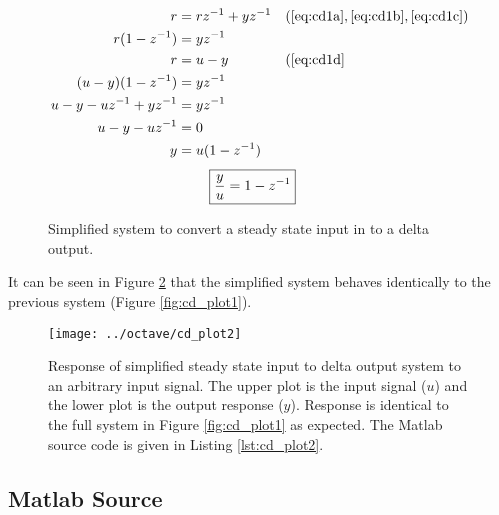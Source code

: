 \documentclass{article}
\begin{document}
\begin{align*}
	r &= r z^{-1} + y z^{-1} && (\ref{eq:cd1a}, \ref{eq:cd1b}, \ref{eq:cd1c})\\
	r(1 - z^{-1}) &= y z^{-1} \\
	r &= u - y && (\ref{eq:cd1d} \\
	(u - y)(1 - z^{-1}) &= y z^{-1} \\
	u - y - u z^{-1} + y z^{-1} &= y z^{-1} \\
	u - y - u z^{-1} &= 0 \\
	y &= u (1 - z^{-1})
\end{align*}
\begin{align}
	\Aboxed{ \frac{y}{u} &= 1 - z^{-1} }
\end{align}

\begin{figure}[!htbp]
\begin{center}


\end{center}
\caption{Simplified system to convert a steady state input in to
a delta output.}
\label{fig:cd1s}
\end{figure}

It can be seen in Figure \ref{fig:cd_plot2} that the simplified system
behaves identically to the previous system (Figure \ref{fig:cd_plot1}).

\begin{figure}[htbp!]
\texttt{[image: ../octave/cd\_plot2]}
\caption{Response of simplified steady state input to delta output system
to an arbitrary input signal.
The upper plot is the input signal ($u$) and the lower plot is
the output response ($y$).
Response is identical to the full system in Figure \ref{fig:cd_plot1}
as expected.
The Matlab source code is given in Listing \ref{lst:cd_plot2}.
}
\label{fig:cd_plot2}
\end{figure}

\clearpage
\subsection{Matlab Source}
\label{app:cdsrc}

\nocite{octave}
\end{document}
